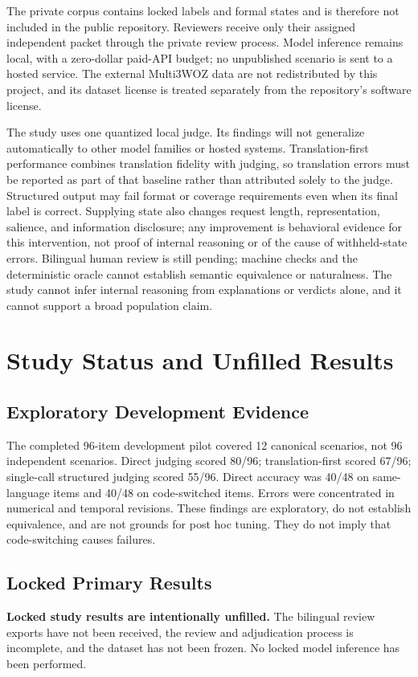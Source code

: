 \documentclass[11pt]{article}
\begin{document}
The private corpus contains locked labels and formal states and is therefore not included in the public repository. Reviewers receive only their assigned independent packet through the private review process. Model inference remains local, with a zero-dollar paid-API budget; no unpublished scenario is sent to a hosted service. The external Multi3WOZ data are not redistributed by this project, and its dataset license is treated separately from the repository's software license.

The study uses one quantized local judge. Its findings will not generalize automatically to other model families or hosted systems. Translation-first performance combines translation fidelity with judging, so translation errors must be reported as part of that baseline rather than attributed solely to the judge. Structured output may fail format or coverage requirements even when its final label is correct. Supplying state also changes request length, representation, salience, and information disclosure; any improvement is behavioral evidence for this intervention, not proof of internal reasoning or of the cause of withheld-state errors. Bilingual human review is still pending; machine checks and the deterministic oracle cannot establish semantic equivalence or naturalness. The study cannot infer internal reasoning from explanations or verdicts alone, and it cannot support a broad population claim.

\section{Study Status and Unfilled Results}
\subsection{Exploratory Development Evidence}
The completed 96-item development pilot covered 12 canonical scenarios, not 96 independent scenarios. Direct judging scored 80/96; translation-first scored 67/96; single-call structured judging scored 55/96. Direct accuracy was 40/48 on same-language items and 40/48 on code-switched items. Errors were concentrated in numerical and temporal revisions. These findings are exploratory, do not establish equivalence, and are not grounds for post hoc tuning. They do not imply that code-switching causes failures.

\subsection{Locked Primary Results}
\textbf{Locked study results are intentionally unfilled.} The bilingual review exports have not been received, the review and adjudication process is incomplete, and the dataset has not been frozen. No locked model inference has been performed.
\end{document}
